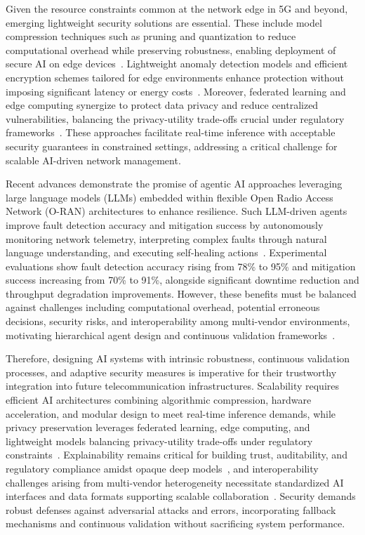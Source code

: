 \documentclass[sigconf]{acmart}
\begin{document}
Given the resource constraints common at the network edge in 5G and beyond, emerging lightweight security solutions are essential. These include model compression techniques such as pruning and quantization to reduce computational overhead while preserving robustness, enabling deployment of secure AI on edge devices~\cite{ref48,ref50}. Lightweight anomaly detection models and efficient encryption schemes tailored for edge environments enhance protection without imposing significant latency or energy costs~\cite{ref50}. Moreover, federated learning and edge computing synergize to protect data privacy and reduce centralized vulnerabilities, balancing the privacy-utility trade-offs crucial under regulatory frameworks~\cite{ref48}. These approaches facilitate real-time inference with acceptable security guarantees in constrained settings, addressing a critical challenge for scalable AI-driven network management.

Recent advances demonstrate the promise of agentic AI approaches leveraging large language models (LLMs) embedded within flexible Open Radio Access Network (O-RAN) architectures to enhance resilience. Such LLM-driven agents improve fault detection accuracy and mitigation success by autonomously monitoring network telemetry, interpreting complex faults through natural language understanding, and executing self-healing actions~\cite{ref55}. Experimental evaluations show fault detection accuracy rising from 78\% to 95\% and mitigation success increasing from 70\% to 91\%, alongside significant downtime reduction and throughput degradation improvements. However, these benefits must be balanced against challenges including computational overhead, potential erroneous decisions, security risks, and interoperability among multi-vendor environments, motivating hierarchical agent design and continuous validation frameworks~\cite{ref55}.

Therefore, designing AI systems with intrinsic robustness, continuous validation processes, and adaptive security measures is imperative for their trustworthy integration into future telecommunication infrastructures. Scalability requires efficient AI architectures combining algorithmic compression, hardware acceleration, and modular design to meet real-time inference demands, while privacy preservation leverages federated learning, edge computing, and lightweight models balancing privacy-utility trade-offs under regulatory constraints~\cite{ref48,ref50}. Explainability remains critical for building trust, auditability, and regulatory compliance amidst opaque deep models~\cite{ref50}, and interoperability challenges arising from multi-vendor heterogeneity necessitate standardized AI interfaces and data formats supporting scalable collaboration~\cite{ref55}. Security demands robust defenses against adversarial attacks and errors, incorporating fallback mechanisms and continuous validation without sacrificing system performance.
\end{document}
